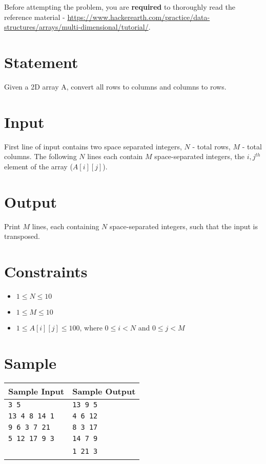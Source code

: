 \documentclass{article}
\begin{document}
Before attempting the problem, you are \textbf{required} to thoroughly read the reference material - \url{https://www.hackerearth.com/practice/data-structures/arrays/multi-dimensional/tutorial/}.

\section*{Statement}

Given a 2D array A, convert all rows to columns and columns to rows.

\section*{Input}

First line of input contains two space separated integers, $N$ - total rows, $M$ - total columns. The following $N$ lines each contain $M$ space-separated integers, the $i,j^{th}$ element of the array ($A[i][j]$).

\section*{Output}

Print $M$ lines, each containing $N$ space-separated integers, such that the input is transposed.

\section*{Constraints}

\begin{itemize}
    \item $1 \le N \le 10$
    \item $1 \le M \le 10$
    \item $1 \le A[i][j] \le 100$, where $0 \le i < N$ and $0 \le j < M$
\end{itemize}

\section*{Sample}

\begin{tabular}{l|l}
    \hline
    \hline
    Sample Input & Sample Output \\
    \hline
    \verb+3 5+ & \verb+13 9 5+ \\
    \verb+13 4 8 14 1+ & \verb+4 6 12+ \\
    \verb+9 6 3 7 21+ & \verb+8 3 17+ \\
    \verb+5 12 17 9 3+ & \verb+14 7 9+ \\
    \ & \verb+1 21 3+ \\
    \hline
\end{tabular}
\end{document}
